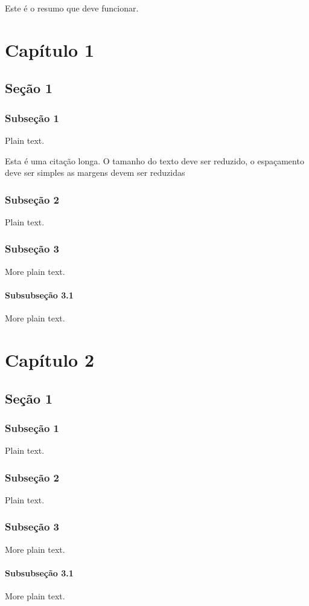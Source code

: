 \documentclass{abntex2}
\begin{document}
\begin{resumo}
Este é o resumo que deve funcionar.
\end{resumo}

\chapter{Capítulo 1}

\section{Seção 1}

\subsection{Subseção 1}

Plain text.

\begin{citacao}
Esta é uma citação longa. O tamanho do texto deve ser reduzido, o espaçamento
deve ser simples as margens devem ser reduzidas
\end{citacao}

\subsection{Subseção 2}

Plain text.

\subsection{Subseção 3}

More plain text.

\subsubsection{Subsubseção 3.1}

More plain text.



\chapter{Capítulo 2}

\section{Seção 1}

\subsection{Subseção 1}

Plain text.

\subsection{Subseção 2}

Plain text.

\subsection{Subseção 3}

More plain text.

\subsubsection{Subsubseção 3.1}

More plain text.
\end{document}
